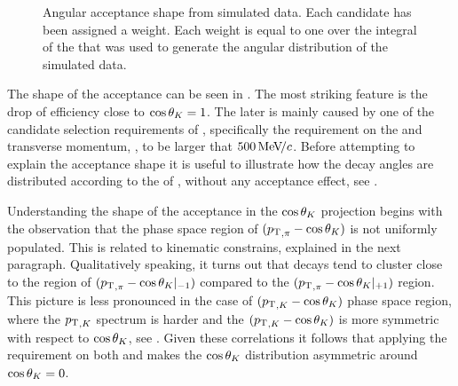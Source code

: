 \begin{figure}[t]
  \centering
  \begin{subfigure}{0.49\textwidth}
    \raggedright
    \scalebox{1.12}{}
    \caption{}
    \label{angAcc_ctk}
  \end{subfigure}%
  \hfill%
  \begin{subfigure}{0.49\textwidth}
    \raggedleft
    \scalebox{1.12}{}
    \caption{}
    \label{angAcc_ctl}
  \end{subfigure}
  \vspace*{0.02\textwidth}
  \begin{subfigure}{0.49\textwidth}
    \raggedright
    \scalebox{1.12}{}
    \caption{}
    \label{angAcc_phi}
  \end{subfigure}
  \caption{Angular acceptance shape from simulated data. Each candidate has been assigned a weight. Each weight is
           equal to one over the integral of the \pdf that was used to generate the angular distribution of the simulated data.}
  \label{angAcc_all}
\end{figure}

The shape of the acceptance can be seen in . The most striking feature is the drop of efficiency
close to $\cos\theta_{K}=1$. The later is mainly caused by one of the candidate selection requirements of ,
specifically the requirement on the \kaon and \pion transverse momentum, \pt, to be larger that $500{\mathrm{\,Me\kern -0.1em V\!/}c}$.
Before attempting to explain the acceptance shape it is useful to illustrate how the decay angles are
distributed according to the \pdf of , \ie without any acceptance effect, see .

Understanding the shape of the acceptance in the $\cos\theta_{K}$ projection begins with the observation
that the phase space region of $(\mbox{$p_{\rm T}$}_{,\pi}-\cos\theta_{K})$ is not uniformly populated. This is related to kinematic
constrains, explained in the next paragraph. Qualitatively speaking, it turns out that \Bs decays tend to cluster
close to the region of $(\mbox{$p_{\rm T}$}_{,\pi}-\cos\theta_{K}|_{-1})$ compared to the $(\mbox{$p_{\rm T}$}_{,\pi}-\cos\theta_{K}|_{+1})$ region.
This picture is less pronounced in the case of $(\mbox{$p_{\rm T}$}_{,K}-\cos\theta_{K})$ phase space region, where the $\mbox{$p_{\rm T}$}_{,K}$
spectrum is harder and the $(\mbox{$p_{\rm T}$}_{,K}-\cos\theta_{K})$ is more symmetric with respect to $\cos\theta_{K}$, see . Given these
correlations it follows that applying the \pt requirement on both \kaon and \pion makes the $\cos\theta_{K}$ distribution
asymmetric around $\cos\theta_{K}=0$.

